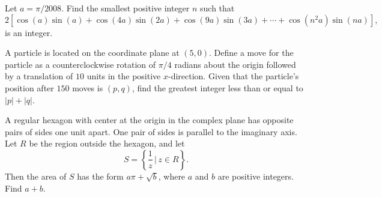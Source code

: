 \begin{question}[name={2008 AIME II, \href{https://artofproblemsolving.com/community/c4p1088468}{Problem 8}}]
	Let $ a=\pi/2008$. Find the smallest positive integer $ n$ such that
	\[ 2[\cos(a)\sin(a)+\cos(4a)\sin(2a)+\cos(9a)\sin(3a)+\cdots+\cos(n^2a)\sin(na)],\]is an integer.
\end{question}


%	













\begin{question}[name={2008 AIME II, \href{https://artofproblemsolving.com/community/c4p1088469}{Problem 9}}]
	A particle is located on the coordinate plane at $ (5,0)$. Define a move for the particle as a counterclockwise rotation of $ \pi/4$ radians about the origin followed by a translation of $ 10$ units in the positive $ x$-direction. Given that the particle's position after $ 150$ moves is $ (p,q)$, find the greatest integer less than or equal to $|p|+|q|$.
\end{question}


%	












\begin{question}[name={2008 AIME II, \href{https://artofproblemsolving.com/community/c4p1088478}{Problem 13}}]
	A regular hexagon with center at the origin in the complex plane has opposite pairs of sides one unit apart. One pair of sides is parallel to the imaginary axis. Let $ R$ be the region outside the hexagon, and let $$ S=\left\{\frac{1}{z}\,\big| \, z\in  R\right\}.$$ Then the area of $ S$ has the form $ a\pi+\sqrt{b}$, where $ a$ and $ b$ are positive integers. Find $a+b$.	
\end{question}


%	

















